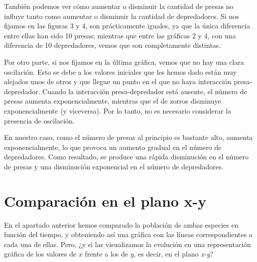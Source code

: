 \documentclass[11pt,a4paper]{article}
\begin{document}
También podemos ver cómo aumentar o disminuir la cantidad de presas no influye tanto como aumentar o disminuir la cantidad de depredadores.
Si nos fijamos en las figuras 3 y 4, son prácticamente iguales, ya que la única diferencia entre ellas han sido 10 presas; mientras que entre
las gráficas 2 y 4, con una diferencia de 10 depredadores, vemos que son completamente distintas.

Por otro parte, si nos fijamos en la última gráfica, vemos que no hay una clara oscilación. Esto se debe a los valores iniciales que les
hemos dado están muy alejados unos de otros y que llegue un punto en el que no haya interacción presa-depredador. Cuando la interacción
presa-depredador está ausente, el número de presas aumenta exponencialmente, mientras que el de zorros disminuye exponencialmente (y viceversa).
Por lo tanto, no es necesario considerar la presencia de oscilación.

 En nuestro caso, como el número de presas al principio es bastante alto, aumenta exponencialmente, lo que provoca un aumento gradual en el
 número de depredadores. Como resultado, se produce una rápida disminución en el número de presas y una disminución exponencial en el número
 de depredadores.


 \section{Comparación en el plano x-y}

 En el apartado anterior hemos comparado la población de ambas especies en función del tiempo, y obteniendo así una gráfica con las líneas
 correspondientes a cada una de ellas. Pero, ¿y si las visualizamos la evolución en una representación gráfica de los valores de $x$ frente
 a los de $y$, es decir, en el plano \textit{x-y}?
\end{document}
